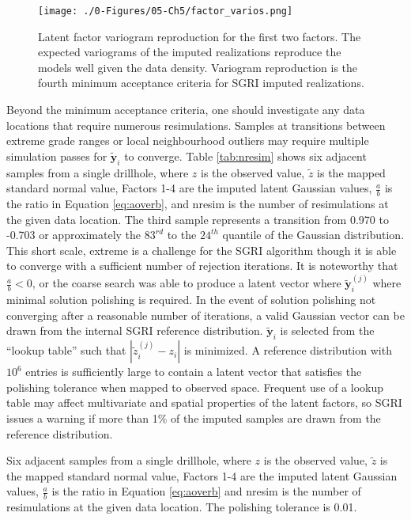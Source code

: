 \begin{figure}[htb!]
    \centering
    \texttt{[image: ./0-Figures/05-Ch5/factor\_varios.png]}
    \caption{Latent factor variogram reproduction for the first two factors. The expected variograms of the imputed realizations reproduce the models well given the data density. Variogram reproduction is the fourth minimum acceptance criteria for \gls{SGRI} imputed realizations.}
    \label{fig:factor_varios}
\end{figure}

Beyond the minimum acceptance criteria, one should investigate any data locations that require numerous resimulations. Samples at transitions between extreme grade ranges or local neighbourhood outliers may require multiple simulation passes for $\tilde{\mathbf{y}}_{i}$ to converge. Table \ref{tab:nresim} shows six adjacent samples from a single drillhole, where $z$ is the observed value, $\tilde{z}$ is the mapped standard normal value, Factors 1-4 are the imputed latent Gaussian values, $\frac{a}{b}$ is the ratio in Equation \ref{eq:aoverb}, and nresim is the number of resimulations at the given data location. The third sample represents a transition from 0.970 to -0.703 or approximately the $83^{rd}$ to the $24^{th}$ quantile of the Gaussian distribution. This short scale, extreme is a challenge for the \gls{SGRI} algorithm though it is able to converge with a sufficient number of rejection iterations. It is noteworthy that $\frac{a}{b} < 0$, or the coarse search was able to produce a latent vector where $\tilde{\mathbf{y}}_{i}^{(j)}$ where minimal solution polishing is required. In the event of solution polishing not converging after a reasonable number of iterations, a valid Gaussian vector can be drawn from the internal \gls{SGRI} reference distribution. $\tilde{\mathbf{y}}_{i}$ is selected from the ``lookup table'' such that $|\tilde{z}_{i}^{(j)} - z_{i}|$ is minimized. A reference distribution with $10^{6}$ entries is sufficiently large to contain a latent vector that satisfies the polishing tolerance when mapped to observed space. Frequent use of a lookup table may affect multivariate and spatial properties of the latent factors, so \gls{SGRI} issues a warning if more than 1\% of the imputed samples are drawn from the reference distribution.


\begin{table}[!htb]
    \centering
    \caption{Six adjacent samples from a single drillhole, where $z$ is the observed value, $\tilde{z}$ is the mapped standard normal value, Factors 1-4 are the imputed latent Gaussian values, $\frac{a}{b}$ is the ratio in Equation \ref{eq:aoverb} and nresim is the number of resimulations at the given data location. The polishing tolerance is 0.01. }
    \resizebox{0.9\width}{!}{}
    \label{tab:nresim}
\end{table}


